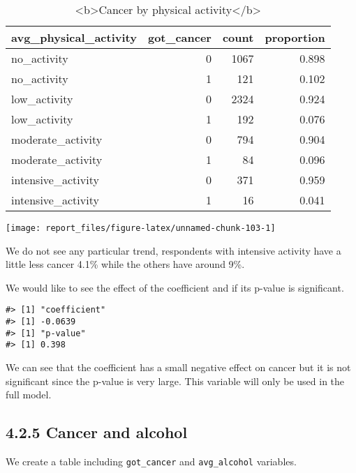 \documentclass[
]{article}
\begin{document}
\begin{table}

\caption{\label{tab:unnamed-chunk-103}<b>Cancer by physical activity</b>}
\centering
\begin{tabular}[t]{l|r|r|r}
\hline
avg\_physical\_activity & got\_cancer & count & proportion\\
\hline
no\_activity & 0 & 1067 & 0.898\\
\hline
no\_activity & 1 & 121 & 0.102\\
\hline
low\_activity & 0 & 2324 & 0.924\\
\hline
low\_activity & 1 & 192 & 0.076\\
\hline
moderate\_activity & 0 & 794 & 0.904\\
\hline
moderate\_activity & 1 & 84 & 0.096\\
\hline
intensive\_activity & 0 & 371 & 0.959\\
\hline
intensive\_activity & 1 & 16 & 0.041\\
\hline
\end{tabular}
\end{table}

\begin{center}\texttt{[image: report\_files/figure-latex/unnamed-chunk-103-1]} \end{center}

We do not see any particular trend, respondents with intensive activity
have a little less cancer 4.1\% while the others have around 9\%.

We would like to see the effect of the coefficient and if its p-value is
significant.

\begin{verbatim}
#> [1] "coefficient"
#> [1] -0.0639
#> [1] "p-value"
#> [1] 0.398
\end{verbatim}

We can see that the coefficient has a small negative effect on cancer
but it is not significant since the p-value is very large. This variable
will only be used in the full model.

\hypertarget{cancer-and-alcohol}{%
\subsection{4.2.5 Cancer and alcohol}\label{cancer-and-alcohol}}

We create a table including \texttt{got\_cancer} and
\texttt{avg\_alcohol} variables.
\end{document}
